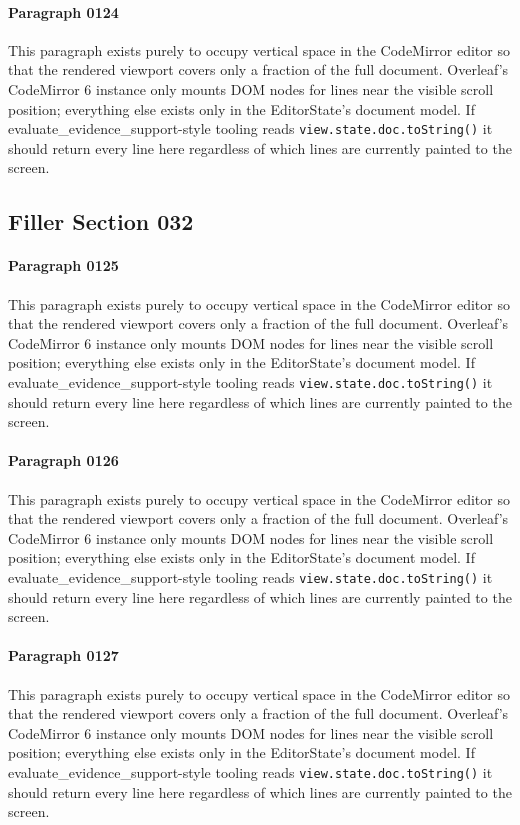 \documentclass{article}
\begin{document}
\paragraph{Paragraph 0124}
This paragraph exists purely to occupy vertical space in the CodeMirror editor so that the rendered viewport covers only a fraction of the full document. Overleaf's CodeMirror 6 instance only mounts DOM nodes for lines near the visible scroll position; everything else exists only in the EditorState's document model. If evaluate\_evidence\_support-style tooling reads \texttt{view.state.doc.toString()} it should return every line here regardless of which lines are currently painted to the screen.

\subsection{Filler Section 032}
\paragraph{Paragraph 0125}
This paragraph exists purely to occupy vertical space in the CodeMirror editor so that the rendered viewport covers only a fraction of the full document. Overleaf's CodeMirror 6 instance only mounts DOM nodes for lines near the visible scroll position; everything else exists only in the EditorState's document model. If evaluate\_evidence\_support-style tooling reads \texttt{view.state.doc.toString()} it should return every line here regardless of which lines are currently painted to the screen.

\paragraph{Paragraph 0126}
This paragraph exists purely to occupy vertical space in the CodeMirror editor so that the rendered viewport covers only a fraction of the full document. Overleaf's CodeMirror 6 instance only mounts DOM nodes for lines near the visible scroll position; everything else exists only in the EditorState's document model. If evaluate\_evidence\_support-style tooling reads \texttt{view.state.doc.toString()} it should return every line here regardless of which lines are currently painted to the screen.

\paragraph{Paragraph 0127}
This paragraph exists purely to occupy vertical space in the CodeMirror editor so that the rendered viewport covers only a fraction of the full document. Overleaf's CodeMirror 6 instance only mounts DOM nodes for lines near the visible scroll position; everything else exists only in the EditorState's document model. If evaluate\_evidence\_support-style tooling reads \texttt{view.state.doc.toString()} it should return every line here regardless of which lines are currently painted to the screen.
\end{document}
